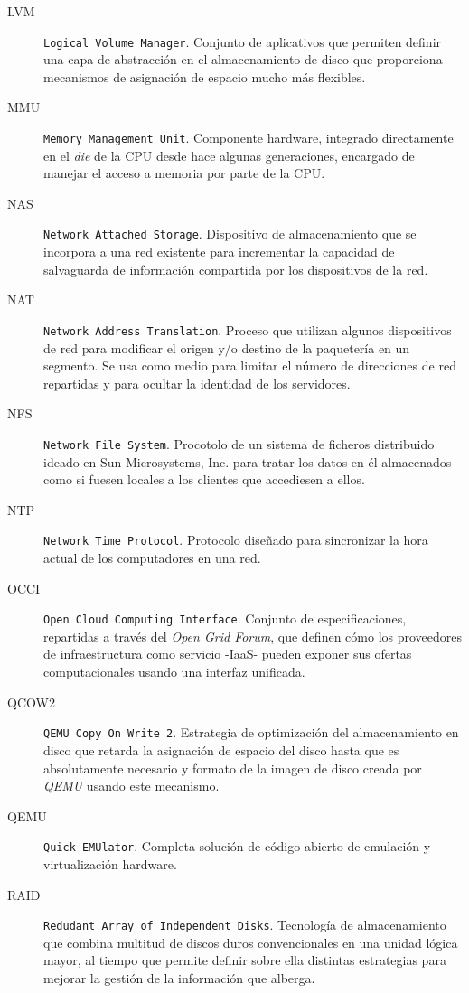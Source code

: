 \begin{description}
\item[LVM] \texttt{Logical Volume Manager}. Conjunto de aplicativos que permiten de\-fi\-nir una capa de abstracci\'on en el almacenamiento de disco que proporciona mecanismos de asignaci\'on de espacio mucho m\'as flexibles.
\item[MMU] \texttt{Memory Management Unit}. Componente hardware, integrado directamente en el \emph{die} de la CPU desde hace algunas generaciones, encargado de manejar el acceso a memoria por parte de la CPU.
\item[NAS] \texttt{Network Attached Storage}. Dispositivo de almacenamiento que se incorpora a una red existente para incrementar la capacidad de salvaguarda de informaci\'on compartida por los dispositivos de la red.
\item[NAT] \texttt{Network Address Translation}. Proceso que utilizan algunos dis\-po\-si\-ti\-vos de red para modificar el origen y/o destino de la paqueter\'ia en un segmento. Se usa como medio para limitar el n\'umero de direcciones de red repartidas y para ocultar la identidad de los servidores.
\item[NFS] \texttt{Network File System}. Procotolo de un sistema de ficheros distribuido ideado en Sun Microsystems, Inc. para tratar los datos en \'el almacenados como si fuesen locales a los clientes que accediesen a ellos.
\item[NTP] \texttt{Network Time Protocol}. Protocolo dise\~nado para sincronizar la hora actual de los computadores en una red.
\item[OCCI] \texttt{Open Cloud Computing Interface}. Conjunto de especificaciones, re\-par\-ti\-das a trav\'es del \emph{Open Grid Forum}, que definen c\'omo los proveedores de infraestructura como servicio -IaaS- pueden exponer sus ofertas computacionales usando una interfaz unificada.
\item[QCOW2] \texttt{QEMU Copy On Write 2}. Estrategia de optimizaci\'on del almacenamiento en disco que retarda la asignaci\'on de espacio del disco hasta que es absolutamente necesario y formato de la imagen de disco creada por \emph{QEMU} usando este mecanismo.
\item[QEMU] \texttt{Quick EMUlator}. Completa soluci\'on de c\'odigo abierto de emulaci\'on y virtualizaci\'on hardware.
\item[RAID] \texttt{Redudant Array of Independent Disks}. Tecnolog\'ia de al\-ma\-ce\-na\-mien\-to que combina multitud de discos duros convencionales en una unidad l\'ogica mayor, al tiempo que permite definir sobre ella distintas estrategias para mejorar la gesti\'on de la informaci\'on que alberga.

\end{description}
